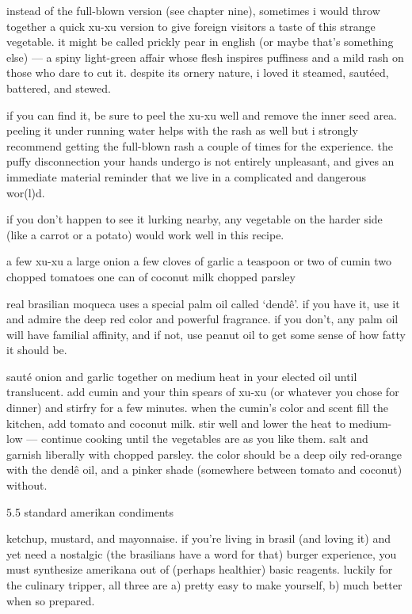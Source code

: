 instead of the full-blown version (see chapter nine), sometimes i would throw together a quick xu-xu version to give foreign visitors a taste of this strange vegetable. it might be called prickly pear in english (or maybe that's something else) --- a spiny light-green affair whose flesh inspires puffiness and a mild rash on those who dare to cut it. despite its ornery nature, i loved it steamed, saut\'{e}ed, battered, and stewed.

if you can find it, be sure to peel the xu-xu well and remove the inner seed area. peeling it under running water helps with the rash as well but i strongly recommend getting the full-blown rash a couple of times for the experience. the puffy disconnection your hands undergo is not entirely unpleasant, and gives an immediate material reminder that we live in a complicated and dangerous wor(l)d.

if you don't happen to see it lurking nearby, any vegetable on the harder side (like a carrot or a potato) would work well in this recipe.

a few xu-xu
a large onion
a few cloves of garlic
a teaspoon or two of cumin
two chopped tomatoes
one can of coconut milk
chopped parsley

	real brasilian moqueca uses a special palm oil called `dend\^{e}'. if you have it, use it and admire the deep red color and powerful fragrance. if you don't, any palm oil will have familial affinity, and if not, use peanut oil to get some sense of how fatty it should be.

	saut\'{e} onion and garlic together on medium heat in your elected oil until translucent. add cumin and your thin spears of xu-xu (or whatever you chose for dinner) and stirfry for a few minutes. when the cumin's color and scent fill the kitchen, add tomato and coconut milk. stir well and lower the heat to medium-low --- continue cooking until the vegetables are as you like them. salt and garnish liberally with chopped parsley. the color should be a deep oily red-orange with the dend\^{e} oil, and a pinker shade (somewhere between tomato and coconut) without.

5.5  standard amerikan condiments

ketchup, mustard, and mayonnaise. if you're living in brasil (and loving it) and yet need a nostalgic (the brasilians have a word for that) burger experience, you must synthesize amerikana out of (perhaps healthier) basic reagents. luckily for the culinary tripper, all three are a) pretty easy to make yourself, b) much better when so prepared.

